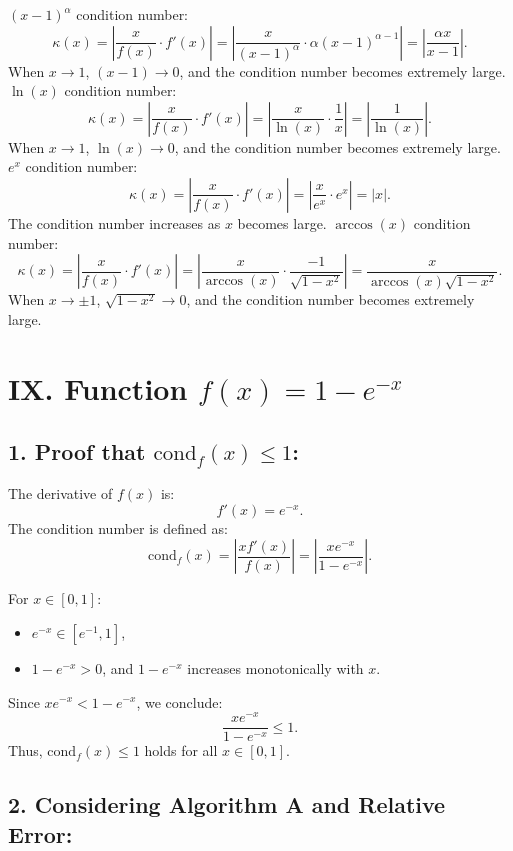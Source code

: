 \documentclass{article}
\begin{document}
\( (x - 1)^\alpha \) condition number: 
\[ 
\kappa(x) = \left| \frac{x}{f(x)} \cdot f'(x) \right| = \left| \frac{x}{(x - 1)^\alpha} \cdot \alpha (x - 1)^{\alpha - 1} \right| = \left| \frac{\alpha x}{x - 1} \right|. 
\] 
When \( x \to 1 \), \( (x - 1) \to 0 \), and the condition number becomes extremely large. 
\( \ln(x) \) condition number: 
\[ 
\kappa(x) = \left| \frac{x}{f(x)} \cdot f'(x) \right| = \left| \frac{x}{\ln(x)} \cdot \frac{1}{x} \right| = \left| \frac{1}{\ln(x)} \right|. 
\] 
When \( x \to 1 \), \( \ln(x) \to 0 \), and the condition number becomes extremely large. 
\( e^x \) condition number: 
\[ 
\kappa(x) = \left| \frac{x}{f(x)} \cdot f'(x) \right| = \left| \frac{x}{e^x} \cdot e^x \right| = |x|. 
\] 
The condition number increases as \( x \) becomes large. 
 \( \arccos(x) \) condition number: 
\[ 
\kappa(x) = \left| \frac{x}{f(x)} \cdot f'(x) \right| = \left| \frac{x}{\arccos(x)} \cdot \frac{-1}{\sqrt{1 - x^2}} \right| = \frac{x}{\arccos(x) \sqrt{1 - x^2}}. 
\] 
When \( x \to \pm 1 \), \( \sqrt{1 - x^2} \to 0 \), and the condition number becomes extremely large. 


\section{IX. Function \( f(x) = 1 - e^{-x} \)}
\subsection{1. Proof that \( \text{cond}_{f}(x) \leq 1 \):}

The derivative of \( f(x) \) is:
\[
f'(x) = e^{-x}.
\]
The condition number is defined as:
\[
\text{cond}_{f}(x) = \left| \frac{x f'(x)}{f(x)} \right| = \left| \frac{x e^{-x}}{1 - e^{-x}} \right|.
\]

For \( x \in [0, 1] \):
\begin{itemize}
    \item \( e^{-x} \in [e^{-1}, 1] \),
    \item \( 1 - e^{-x} > 0 \), and \( 1 - e^{-x} \) increases monotonically with \( x \).
\end{itemize}

Since \( x e^{-x} < 1 - e^{-x} \), we conclude:
\[
\frac{x e^{-x}}{1 - e^{-x}} \leq 1.
\]
Thus, \( \text{cond}_{f}(x) \leq 1 \) holds for all \( x \in [0, 1] \).

\subsection{2. Considering Algorithm A and Relative Error:}
\end{document}
